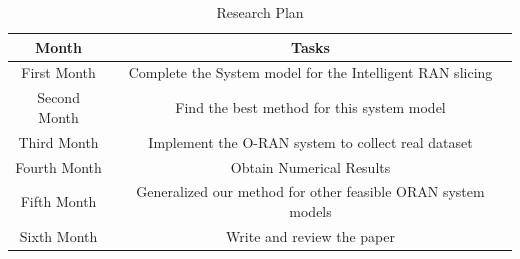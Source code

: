 \documentclass{article}
\begin{document}
\begin{table}
 \caption {Research Plan} \label{table:1a}
 \begin{center}
  \begin{tabular}{||c c ||}
  \hline
Month & Tasks \\ [0.5ex]
  \hline\hline
  First Month & Complete the System model for the Intelligent RAN slicing\\
  \hline
  Second Month & Find the best method for this system model \\
  \hline
  Third Month & Implement the O-RAN system to collect real dataset  \\
  \hline
    Fourth Month & Obtain Numerical Results\\
  \hline
    Fifth Month & Generalized our method for other feasible ORAN system models\\
  \hline
      Sixth Month & Write and review the paper\\
  \hline
 \end{tabular}
 \end{center}
 \end{table}

 




\vspace{20mm}
\end{document}

